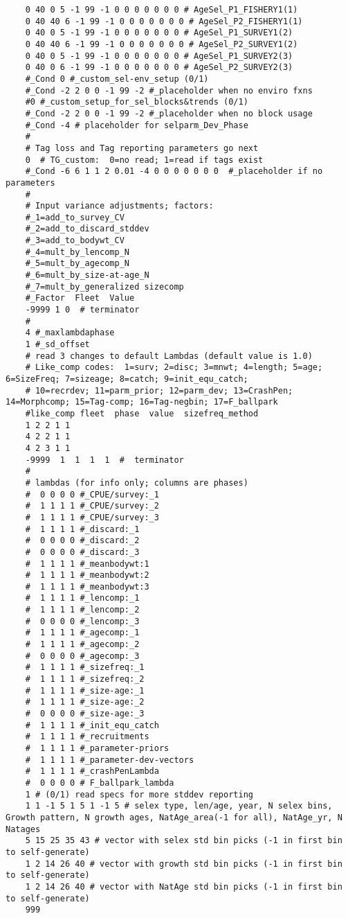 \begin{landscape}
{\begin{verbatim}
	0 40 0 5 -1 99 -1 0 0 0 0 0 0 0 # AgeSel_P1_FISHERY1(1)
	0 40 40 6 -1 99 -1 0 0 0 0 0 0 0 # AgeSel_P2_FISHERY1(1)
	0 40 0 5 -1 99 -1 0 0 0 0 0 0 0 # AgeSel_P1_SURVEY1(2)
	0 40 40 6 -1 99 -1 0 0 0 0 0 0 0 # AgeSel_P2_SURVEY1(2)
	0 40 0 5 -1 99 -1 0 0 0 0 0 0 0 # AgeSel_P1_SURVEY2(3)
	0 40 0 6 -1 99 -1 0 0 0 0 0 0 0 # AgeSel_P2_SURVEY2(3)
	#_Cond 0 #_custom_sel-env_setup (0/1) 
	#_Cond -2 2 0 0 -1 99 -2 #_placeholder when no enviro fxns
	#0 #_custom_setup_for_sel_blocks&trends (0/1) 
	#_Cond -2 2 0 0 -1 99 -2 #_placeholder when no block usage
	#_Cond -4 # placeholder for selparm_Dev_Phase
	#
	# Tag loss and Tag reporting parameters go next
	0  # TG_custom:  0=no read; 1=read if tags exist
	#_Cond -6 6 1 1 2 0.01 -4 0 0 0 0 0 0 0  #_placeholder if no parameters
	#
	# Input variance adjustments; factors: 
	#_1=add_to_survey_CV
	#_2=add_to_discard_stddev
	#_3=add_to_bodywt_CV
	#_4=mult_by_lencomp_N
	#_5=mult_by_agecomp_N
	#_6=mult_by_size-at-age_N
	#_7=mult_by_generalized sizecomp
	#_Factor  Fleet  Value
	-9999 1 0  # terminator
	#
	4 #_maxlambdaphase
	1 #_sd_offset
	# read 3 changes to default Lambdas (default value is 1.0)
	# Like_comp codes:  1=surv; 2=disc; 3=mnwt; 4=length; 5=age; 6=SizeFreq; 7=sizeage; 8=catch; 9=init_equ_catch; 
	# 10=recrdev; 11=parm_prior; 12=parm_dev; 13=CrashPen; 14=Morphcomp; 15=Tag-comp; 16=Tag-negbin; 17=F_ballpark
	#like_comp fleet  phase  value  sizefreq_method
	1 2 2 1 1
	4 2 2 1 1
	4 2 3 1 1
	-9999  1  1  1  1  #  terminator
	#
	# lambdas (for info only; columns are phases)
	#  0 0 0 0 #_CPUE/survey:_1
	#  1 1 1 1 #_CPUE/survey:_2
	#  1 1 1 1 #_CPUE/survey:_3
	#  1 1 1 1 #_discard:_1
	#  0 0 0 0 #_discard:_2
	#  0 0 0 0 #_discard:_3
	#  1 1 1 1 #_meanbodywt:1
	#  1 1 1 1 #_meanbodywt:2
	#  1 1 1 1 #_meanbodywt:3
	#  1 1 1 1 #_lencomp:_1
	#  1 1 1 1 #_lencomp:_2
	#  0 0 0 0 #_lencomp:_3
	#  1 1 1 1 #_agecomp:_1
	#  1 1 1 1 #_agecomp:_2
	#  0 0 0 0 #_agecomp:_3
	#  1 1 1 1 #_sizefreq:_1
	#  1 1 1 1 #_sizefreq:_2
	#  1 1 1 1 #_size-age:_1
	#  1 1 1 1 #_size-age:_2
	#  0 0 0 0 #_size-age:_3
	#  1 1 1 1 #_init_equ_catch
	#  1 1 1 1 #_recruitments
	#  1 1 1 1 #_parameter-priors
	#  1 1 1 1 #_parameter-dev-vectors
	#  1 1 1 1 #_crashPenLambda
	#  0 0 0 0 # F_ballpark_lambda
	1 # (0/1) read specs for more stddev reporting 
	1 1 -1 5 1 5 1 -1 5 # selex type, len/age, year, N selex bins, Growth pattern, N growth ages, NatAge_area(-1 for all), NatAge_yr, N Natages
	5 15 25 35 43 # vector with selex std bin picks (-1 in first bin to self-generate)
	1 2 14 26 40 # vector with growth std bin picks (-1 in first bin to self-generate)
	1 2 14 26 40 # vector with NatAge std bin picks (-1 in first bin to self-generate)
	999
\end{verbatim}
}
\end{landscape}